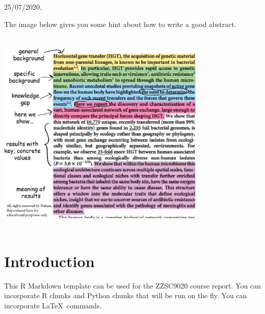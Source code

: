 \documentclass[mstat,12pt]{unswthesis}
\begin{document}
{\bigskip\bigskip\bigskip\noindent} 25/07/2020.




The image below gives you some hint about how to write a good abstract.

\par

\bigskip \includegraphics[width=10cm,height=10cm]{good-abstract.png}



\afterpreface





%
%






\hypertarget{introduction}{%
\chapter{Introduction}\label{introduction}}

This R Markdown template can be used for the ZZSC9020 course report. You
can incorporate R \cite{R} chunks and Python chunks that will be run on
the fly. You can incorporate \LaTeX~commands.
\end{document}
